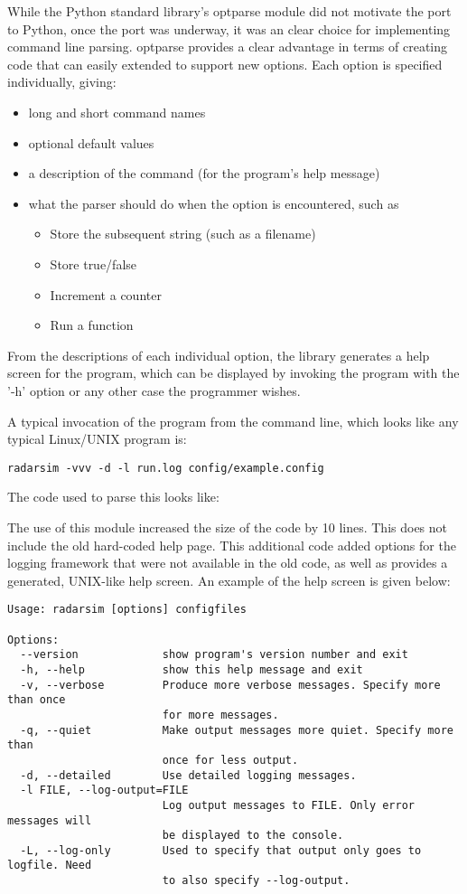 \documentclass[twocolumn]{article}
\begin{document}
While the Python standard library's optparse module did not motivate the port
to Python, once the port was underway, it was an clear choice for implementing
command line parsing. optparse provides a clear advantage in terms of creating
code that can easily extended to support new options.  Each option is specified
individually, giving:
\begin{itemize}
    \item long and short command names
    \item optional default values
    \item a description of the command (for the program's help message)
    \item what the parser should do when the option is encountered, such as
    \begin{itemize}
        \item Store the subsequent string (such as a filename)
        \item Store true/false
        \item Increment a counter
        \item Run a function
    \end{itemize}
\end{itemize}
From the descriptions of each individual option, the library generates a
help screen for the program, which can be displayed by invoking the program
with the '-h' option or any other case the programmer wishes.

A typical invocation of the program from the command line, which looks like
any typical Linux/UNIX program is:

{\scriptsize\verb$radarsim -vvv -d -l run.log config/example.config$}

The code used to parse this looks like:

\lstset{language=Python}


The use of this module increased the size of the code by 10 lines. This does
not include the old hard-coded help page. This additional code added options
for the logging framework that were not available in the old code, as well
as provides a generated, UNIX-like help screen. An example of the help screen
is given below:

{\tiny
\begin{verbatim}
Usage: radarsim [options] configfiles

Options:
  --version             show program's version number and exit
  -h, --help            show this help message and exit
  -v, --verbose         Produce more verbose messages. Specify more than once
                        for more messages.
  -q, --quiet           Make output messages more quiet. Specify more than
                        once for less output.
  -d, --detailed        Use detailed logging messages.
  -l FILE, --log-output=FILE
                        Log output messages to FILE. Only error messages will
                        be displayed to the console.
  -L, --log-only        Used to specify that output only goes to logfile. Need
                        to also specify --log-output.
\end{verbatim}}
\end{document}
